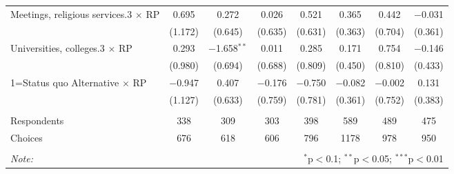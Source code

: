 \begin{table}[!htbp]
\begin{tabular}{@{\extracolsep{5pt}}lccccccc}
  Meetings, religious services.3 $\times$ RP & 0.695 & 0.272 & 0.026 & 0.521 & 0.365 & 0.442 & $-$0.031 \\ 
  & (1.172) & (0.645) & (0.635) & (0.631) & (0.363) & (0.704) & (0.361) \\ 
  Universities, colleges.3 $\times$ RP & 0.293 & $-$1.658$^{**}$ & 0.011 & 0.285 & 0.171 & 0.754 & $-$0.146 \\ 
  & (0.980) & (0.694) & (0.688) & (0.809) & (0.450) & (0.810) & (0.433) \\ 
  1=Status quo Alternative $\times$ RP & $-$0.947 & 0.407 & $-$0.176 & $-$0.750 & $-$0.082 & $-$0.002 & 0.131 \\ 
  & (1.127) & (0.633) & (0.759) & (0.781) & (0.361) & (0.752) & (0.383) \\ 
 \hline \\[-1.8ex] 
Respondents & 338 & 309 & 303 & 398 & 589 & 489 & 475\\ 
 Choices & 676 & 618 & 606 & 796 & 1178 & 978 & 950\\ 
\hline 
\hline \\[-1.8ex] 
\textit{Note:}  & \multicolumn{7}{r}{$^{*}$p$<$0.1; $^{**}$p$<$0.05; $^{***}$p$<$0.01} \\ 
\end{tabular} 
\end{table} 
